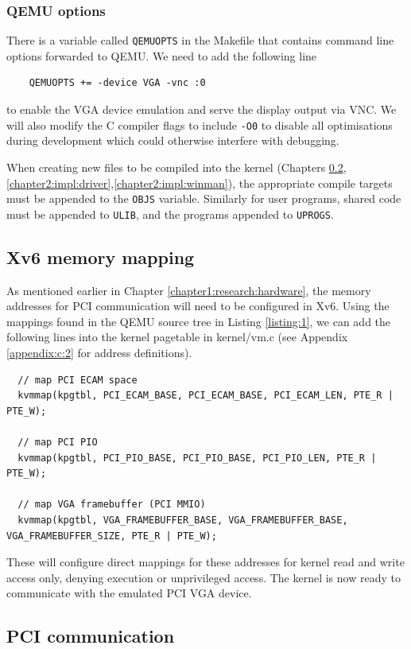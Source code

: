 \subsubsection{QEMU options}
There is a variable called \texttt{QEMUOPTS} in the Makefile that contains
command line options forwarded to QEMU. We need to add the following line
\begin{verbatim}
    QEMUOPTS += -device VGA -vnc :0
\end{verbatim}
to enable the VGA device emulation and serve the display output via VNC. We will also
modify the C compiler flags to include \texttt{-O0} to disable all optimisations
during development which could otherwise interfere with debugging.

When creating new files to be compiled into the kernel 
(Chapters \ref{chapter2:impl:pci},\ref{chapter2:impl:driver},\ref{chapter2:impl:winman}),
the appropriate compile targets must be appended to the \texttt{OBJS} variable. Similarly
for user programs, shared code must be appended to \texttt{ULIB}, and the programs appended
to \texttt{UPROGS}.

\subsection{Xv6 memory mapping}
\label{chapter2:impl:memory}
As mentioned earlier in Chapter \ref{chapter1:research:hardware}, the memory addresses for
PCI communication will need to be configured in Xv6. Using the mappings found in the
QEMU source tree in Listing \ref{listing:1}, we can add the following lines into the kernel
pagetable in kernel/vm.c (see Appendix \ref{appendix:c:2} for address definitions).
\begin{verbatim}
  // map PCI ECAM space
  kvmmap(kpgtbl, PCI_ECAM_BASE, PCI_ECAM_BASE, PCI_ECAM_LEN, PTE_R | PTE_W);

  // map PCI PIO
  kvmmap(kpgtbl, PCI_PIO_BASE, PCI_PIO_BASE, PCI_PIO_LEN, PTE_R | PTE_W);

  // map VGA framebuffer (PCI MMIO)
  kvmmap(kpgtbl, VGA_FRAMEBUFFER_BASE, VGA_FRAMEBUFFER_BASE, VGA_FRAMEBUFFER_SIZE, PTE_R | PTE_W);
\end{verbatim}
These will configure direct mappings for these addresses for kernel read and write access only, denying execution
or unprivileged access. The kernel is now ready to communicate with the emulated PCI VGA device.
\subsection{PCI communication}
\label{chapter2:impl:pci}
